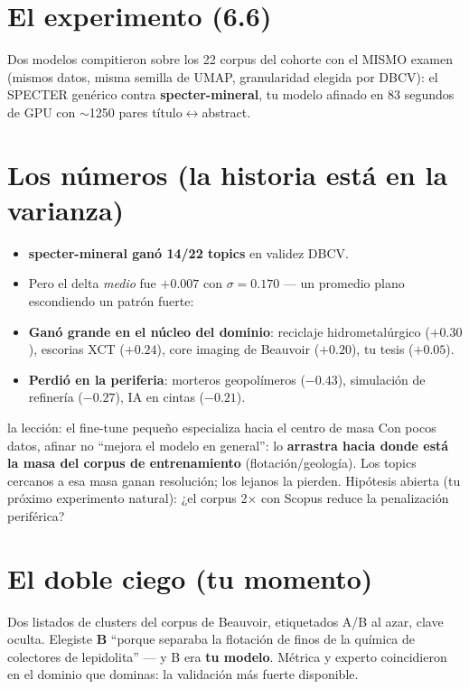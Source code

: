 \documentclass[11pt,a4paper]{article}
\begin{document}

\section{El experimento (6.6)}

Dos modelos compitieron sobre los 22 corpus del cohorte con el MISMO examen (mismos datos,
misma semilla de UMAP, granularidad elegida por DBCV): el SPECTER genérico contra
\textbf{specter-mineral}, tu modelo afinado en 83 segundos de GPU con $\sim$1250 pares
título$\leftrightarrow$abstract.

\section{Los números (la historia está en la varianza)}

\begin{itemize}
  \item \textbf{specter-mineral ganó 14/22 topics} en validez DBCV.
  \item Pero el delta \emph{medio} fue $+0.007$ con $\sigma = 0.170$ — un promedio plano
        escondiendo un patrón fuerte:
  \item \textbf{Ganó grande en el núcleo del dominio}: reciclaje hidrometalúrgico ($+0.30$),
        escorias XCT ($+0.24$), core imaging de Beauvoir ($+0.20$), tu tesis ($+0.05$).
  \item \textbf{Perdió en la periferia}: morteros geopolímeros ($-0.43$), simulación de
        refinería ($-0.27$), IA en cintas ($-0.21$).
\end{itemize}

\begin{concepto}{la lección: el fine-tune pequeño especializa hacia el centro de masa}
Con pocos datos, afinar no ``mejora el modelo en general'': lo \textbf{arrastra hacia donde
está la masa del corpus de entrenamiento} (flotación/geología). Los topics cercanos a esa
masa ganan resolución; los lejanos la pierden. Hipótesis abierta (tu próximo experimento
natural): ¿el corpus 2$\times$ con Scopus reduce la penalización periférica?
\end{concepto}

\section{El doble ciego (tu momento)}

Dos listados de clusters del corpus de Beauvoir, etiquetados A/B al azar, clave oculta.
Elegiste \textbf{B} ``porque separaba la flotación de finos de la química de colectores de
lepidolita'' --- y B era \textbf{tu modelo}. Métrica y experto coincidieron en el dominio
que dominas: la validación más fuerte disponible.
\end{document}

